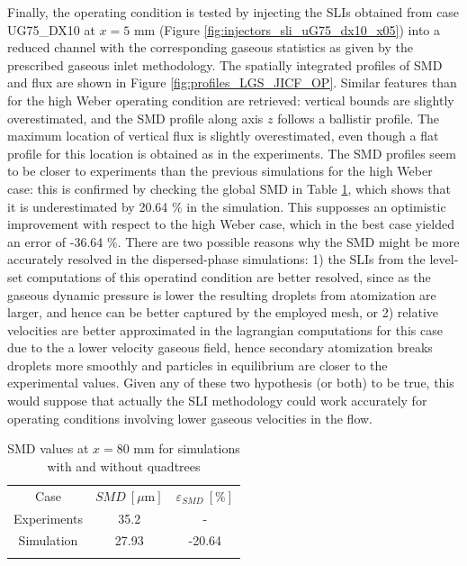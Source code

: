Finally, the operating condition is tested by injecting the SLIs obtained from case UG75\_DX10 at $x = 5$ mm (Figure \ref{fig:injectors_sli_uG75_dx10_x05}) into a reduced channel with the corresponding gaseous statistics as given by the prescribed gaseous inlet methodology. The spatially integrated profiles of SMD and flux are shown in Figure \ref{fig:profiles_LGS_JICF_OP}. Similar features than for the high Weber operating condition are retrieved: vertical bounds are slightly overestimated, and the SMD profile along axis $z$ follows a ballistir profile. The maximum location of vertical flux is slightly overestimated, even though a flat profile for this location is obtained as in the experiments. The SMD profiles seem to be closer to experiments than the previous simulations for the high Weber case: this is confirmed by checking the global SMD in Table \ref{tab:SMD_deviations_OP}, which shows that it is underestimated by 20.64 $\%$ in the simulation. This supposses an optimistic improvement with respect to the high Weber case, which in the best case yielded an error of -36.64 $\%$. There are two possible reasons why the SMD might be more accurately resolved in the dispersed-phase simulations: 1) the SLIs from the level-set computations of this operatind condition are better resolved, since as the gaseous dynamic pressure is lower the resulting droplets from atomization are larger, and hence can be better captured by the employed mesh, or 2) relative velocities are better approximated in the lagrangian computations for this case due to the a lower velocity gaseous field, hence secondary atomization breaks droplets more smoothly and particles in equilibrium are closer to the experimental values. Given any of these two hypothesis (or both) to be true, this would suppose that actually the SLI methodology could work accurately for operating conditions involving lower gaseous velocities in the flow. 


\begin{table}[!h]
\centering
\caption{SMD values at $x = 80$ mm for simulations with and without quadtrees}
\begin{tabular}{ccc}
\thickhline
Case & $SMD~\left[\mu \mathrm{m} \right]$ & $\varepsilon_{SMD}~\left[\% \right]$ \\
\thickhline
Experiments & 35.2 & - \\
Simulation & 27.93 & -20.64 \\
\thickhline
\end{tabular}
\label{tab:SMD_deviations_OP}
\end{table}


